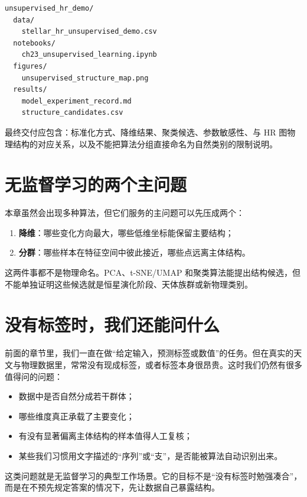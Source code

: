 \begin{examplebox}[最小无监督项目结构]
\begin{lstlisting}[style=terminal]
unsupervised_hr_demo/
  data/
    stellar_hr_unsupervised_demo.csv
  notebooks/
    ch23_unsupervised_learning.ipynb
  figures/
    unsupervised_structure_map.png
  results/
    model_experiment_record.md
    structure_candidates.csv
\end{lstlisting}
\end{examplebox}

最终交付应包含：标准化方式、降维结果、聚类候选、参数敏感性、与 HR 图物理结构的对应关系，以及不能把算法分组直接命名为自然类别的限制说明。

\section{无监督学习的两个主问题}

本章虽然会出现多种算法，但它们服务的主问题可以先压成两个：

\begin{enumerate}
    \item \textbf{降维}：哪些变化方向最大，哪些低维坐标能保留主要结构；
    \item \textbf{分群}：哪些样本在特征空间中彼此接近，哪些点远离主体结构。
\end{enumerate}

这两件事都不是物理命名。PCA、t-SNE/UMAP 和聚类算法能提出结构候选，但不能单独证明这些候选就是恒星演化阶段、天体族群或新物理类别。

\section{没有标签时，我们还能问什么}

前面的章节里，我们一直在做“给定输入，预测标签或数值”的任务。但在真实的天文与物理数据里，常常没有现成标签，或者标签本身很昂贵。这时我们仍然有很多值得问的问题：

\begin{itemize}
    \item 数据中是否自然分成若干群体；
    \item 哪些维度真正承载了主要变化；
    \item 有没有显著偏离主体结构的样本值得人工复核；
    \item 某些我们习惯用文字描述的“序列”或“支”，是否能被算法自动识别出来。
\end{itemize}

这类问题就是无监督学习的典型工作场景。它的目标不是“没有标签时勉强凑合”，而是在不预先规定答案的情况下，先让数据自己暴露结构。

